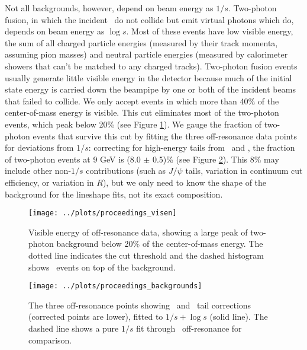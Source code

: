 \documentclass[aps,prd,preprint,superscriptaddress,tightenlines,nofootinbib,floatfix]{revtex4}
\begin{document}
Not all backgrounds, however, depend on beam energy as $1/s$.
Two-photon fusion, in which the incident \ee\ do not collide but emit
virtual photons which do, depends on beam energy as $\log s$.  Most of
these events have low visible energy, the sum of all charged particle
energies (measured by their track momenta, assuming pion masses) and
neutral particle energies (measured by calorimeter showers that can't
be matched to any charged tracks).  Two-photon fusion events usually
generate little visible energy in the detector because much of the
initial state energy is carried down the beampipe by one or both of
the incident beams that failed to collide.  We only accept events in
which more than 40\% of the center-of-mass energy is visible.  This
cut eliminates most of the two-photon events, which peak below 20\%
(see Figure \ref{fig:visen}).  We gauge the fraction of two-photon
events that survive this cut by fitting the three off-resonance data
points for deviations from $1/s$: correcting for high-energy tails
from \uone\ and \utwo, the fraction of two-photon events at 9 GeV is
(8.0 $\pm$ 0.5)\% (see Figure \ref{fig:backfit}).  This 8\% may
include other non-$1/s$ contributions (such as $J/\psi$ tails,
variation in continuum cut efficiency, or variation in $R$), but we
only need to know the shape of the background for the lineshape fits,
not its exact composition.

\begin{figure}[p]
  \begin{center}
    \texttt{[image: ../plots/proceedings\_visen]}
  \end{center}
  \caption{\label{fig:visen} Visible energy of off-resonance data,
    showing a large peak of two-photon background below 20\% of the
    center-of-mass energy.  The dotted line indicates the cut
    threshold and the dashed histogram shows \ups\ events on top of
    the background.}
\end{figure}

\begin{figure}[p]
  \begin{center}
    \texttt{[image: ../plots/proceedings\_backgrounds]}
  \end{center}
  \caption{\label{fig:backfit} The three off-resonance points showing
    \uone\ and \utwo\ tail corrections (corrected points are lower),
    fitted to $1/s + \log s$ (solid line).  The dashed line shows a
    pure $1/s$ fit through \uone\ off-resonance for comparison.}
\end{figure}
\end{document}
